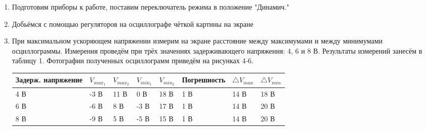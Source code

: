 \documentclass[a4paper, 12pt]{article}%
\begin{document}
\begin{enumerate}

\item Подготовим приборы к работе, поставим переключатель режима в положение "Динамич."
   
\item Добьёмся с помощью регуляторов на осциллографе чёткой картины на экране

\item При максимальном ускоряющем напряжении измерим на экране расстояние между максимумами и между минимумами осциллограммы. Измерения проведём при трёх значениях задерживающего напряжения: 4, 6 и 8 В. Результаты измерений занесём в таблицу 1. Фотографии полученных осциллограмм приведём на рисунках 4-6.

\begin{center}
\begin{tabular}{ |p{3.5cm}||p{1cm}|p{1cm}|p{1cm}|p{1cm}|p{2.5cm}|p{1cm}|p{1cm}|}
 \hline
Задерж. напряжение & $V_{max_1}$ & $V_{max_2}$ & $V_{min_1}$ & $V_{min_2}$ & Погрешность & $\triangle V_{max}$ & $\triangle V_{min}$\\
 \hline
 4 В & -3 В & 11 В & 0 В & 18 В & 1 В & 14 В & 18 В\\
\hline
 6 В & -6 В & 8 В & -3 В & 17 В & 1 В & 14 В & 20 В\\
\hline
 8 В & -9 В & 5 В & -5 В & 15 В & 1 В & 14 В & 20 В\\
\hline

\end{tabular}
\end{center}


\end{enumerate}
\end{document}
